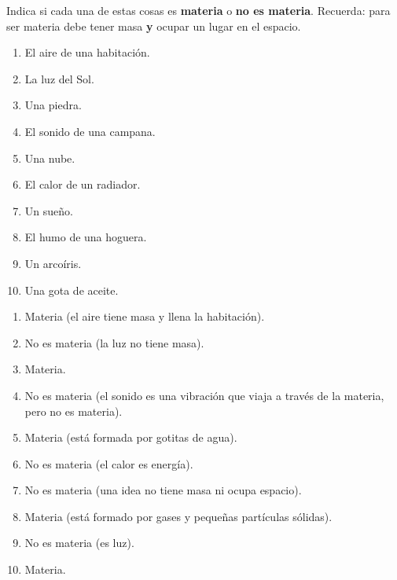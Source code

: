 \begin{exercise}
    Indica si cada una de estas cosas es \textbf{materia} o \textbf{no es materia}. Recuerda: para ser materia debe tener masa \textbf{y} ocupar un lugar en el espacio.
    \begin{enumerate}[label=\letraminuscula]
        \item El aire de una habitación.
        \item La luz del Sol.
        \item Una piedra.
        \item El sonido de una campana.
        \item Una nube.
        \item El calor de un radiador.
        \item Un sueño.
        \item El humo de una hoguera.
        \item Un arcoíris.
        \item Una gota de aceite.
    \end{enumerate}
    \begin{solu}
        \begin{enumerate}[label=\alph*)]
            \item Materia (el aire tiene masa y llena la habitación).
            \item No es materia (la luz no tiene masa).
            \item Materia.
            \item No es materia (el sonido es una vibración que viaja a través de la materia, pero no es materia).
            \item Materia (está formada por gotitas de agua).
            \item No es materia (el calor es energía).
            \item No es materia (una idea no tiene masa ni ocupa espacio).
            \item Materia (está formado por gases y pequeñas partículas sólidas).
            \item No es materia (es luz).
            \item Materia.
        \end{enumerate}
    \end{solu}
\end{exercise}

